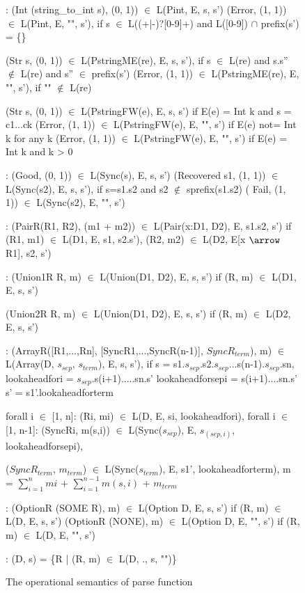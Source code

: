 \begin{figure}[ht]
\begin{center}
{\small
\begin{code}
\cdmath
{}:
  (Int (string\_to\_int s), (0, 1)) $\in$ L(Pint, E, s, s')
  (Error, (1, 1)) $\in$ L(Pint, E, "", s'), 
  if s $\in$ L((+|-)?[0-9]+) and L([0-9]) $\cap$ prefix(s') = \{\}

  (Str s, (0, 1)) $\in$ L(PstringME(re), E, s, s'),
	if s $\in$ L(re) and s.s'' $\not\in$ L(re) and s'' $\in$ prefix(s') 
  (Error, (1, 1)) $\in$ L(PstringME(re), E, "", s'), if "" $\not\in$ L(re)

  (Str s, (0, 1)) $\in$ L(PstringFW(e), E, s, s') if E(e) = Int k and s = c1...ck
  (Error, (1, 1)) $\in$ L(PstringFW(e), E, "", s') if E(e) not= Int k for any k
  (Error, (1, 1)) $\in$ L(PstringFW(e), E, "", s') if E(e) = Int k and k > 0

:
  (Good, (0, 1)) $\in$ L(Sync(s), E, s, s')
  (Recovered s1, (1, 1)) $\in$ L(Sync(s2), E, s, s'), if s=s1.s2 and s2 $\not\in$ sprefix(s1.s2)
(  Fail, (1, 1)) $\in$ L(Sync(s2), E, "", s')

:
  (PairR(R1, R2), (m1 + m2)) $\in$ L(Pair(x:D1, D2), E, s1.s2, s')
        if (R1, m1) $\in$ L(D1, E, s1, s2.s'),
           (R2, m2) $\in$ L(D2, E[x $\arrow$ R1], s2, s')

:
  (Union1R R, m) $\in$ L(Union(D1, D2), E, s, s')
        if (R, m) $\in$ L(D1, E, s, s')

  (Union2R R, m) $\in$ L(Union(D1, D2), E, s, s')
        if (R, m) $\in$ L(D2, E, s, s')

:
  (ArrayR([R1,...,Rn], [SyncR1,...,SyncR(n-1)], $SyncR_{term}$), m)
    $\in$ L(Array(D, $s_{sep}$, $s_{term}$), E, s, s'),
        if
        s = s1.$s_{sep}$.s2.$s_{sep}$...s(n-1).$s_{sep}$.sn,
        lookaheadfori = $s_{sep}$.s(i+1).....sn.s'
        lookaheadforsepi = s(i+1)....sn.s'
        s' = s1'.lookaheadforterm

        forall i $\in$ [1, n]:
          (Ri, mi) $\in$ L(D, E, si, lookaheadfori),
        forall i $\in$ [1, n-1]:
          (SyncRi, m(s,i)) $\in$ L(Sync($s_{sep}$), E, $s_{(sep,i)}$, lookaheadforsepi),

        ($SyncR_{term}$, $m_{term}$) $\in$ L(Sync($s_{term}$), E, s1', lookaheadforterm),
        m = $\sum_{i= 1}^{n} mi$ + $\sum_{i=1}^{n-1} m(s,i)$ + $m_{term}$

:
  (OptionR (SOME R), m) $\in$ L(Option D, E, s, s')
	if (R, m) $\in$ L(D, E, s, s')
  (OptionR (NONE), m) $\in$ L(Option D, E, "", s')
	if (R, m) $\in$ L(D, E, "", s')

:
  (D, s) = \{R | (R, m) $\in$ L(D, ., s, "")\} 
\end{code}
}
\caption{The operational semantics of parse function}
\label{fig:parse-sem}
\end{center}
\end{figure}

